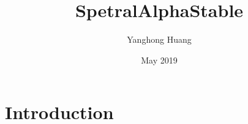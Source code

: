 \documentclass{article}
\title{SpetralAlphaStable}
\author{Yanghong Huang}
\date{May 2019}
\begin{document}
\maketitle

\section{Introduction}
\end{document}

